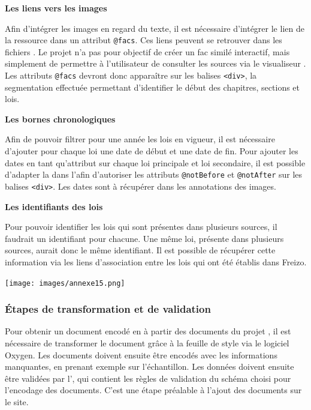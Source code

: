 \bigskip
\textbf{Les liens vers les images}

Afin d’intégrer les images en regard du texte, il est nécessaire d’intégrer le lien de la ressource dans un attribut \texttt{@facs}. Ces liens peuvent se retrouver dans les fichiers \JSON. Le projet n’a pas pour objectif de créer un fac similé interactif, mais simplement de permettre à l’utilisateur de consulter les sources via le visualiseur \IIIF. Les attributs \texttt{@facs} devront donc apparaître sur les balises \texttt{<div>}, la segmentation effectuée permettant d’identifier le début des chapitres, sections et lois. 

\bigskip
\textbf{Les bornes chronologiques}

Afin de pouvoir filtrer pour une année les lois en vigueur, il est nécessaire d’ajouter pour chaque loi une date de début et une date de fin. Pour ajouter les dates en tant qu’attribut sur chaque loi principale et loi secondaire, il est possible d’adapter la \TEI dans l’\ODD afin d’autoriser les attributs \texttt{@notBefore} et \texttt{@notAfter} sur les balises \texttt{<div>}. Les dates sont à récupérer dans les annotations des images.

\bigskip
\textbf{Les identifiants des lois}

Pour pouvoir identifier les lois qui sont présentes dans plusieurs sources, il faudrait un identifiant pour chacune. Une même loi, présente dans plusieurs sources, aurait donc le même identifiant. Il est possible de récupérer cette information via les liens d’association entre les lois qui ont été établis dans Freizo. 

\noindent \texttt{[image: images/annexe15.png]}

\subsubsection{Étapes de transformation et de validation}
Pour obtenir un document encodé en \TEI à partir des documents \XML du projet \LSC, il est nécessaire de transformer le document \XML grâce à la feuille de style \XSL via le logiciel Oxygen. Les documents doivent ensuite être encodés avec les informations manquantes, en prenant exemple sur l’échantillon. Les données doivent ensuite être validées par l’\ODD, qui contient les règles de validation du schéma choisi pour l’encodage des documents. C’est une étape préalable à l’ajout des documents sur le site. 


